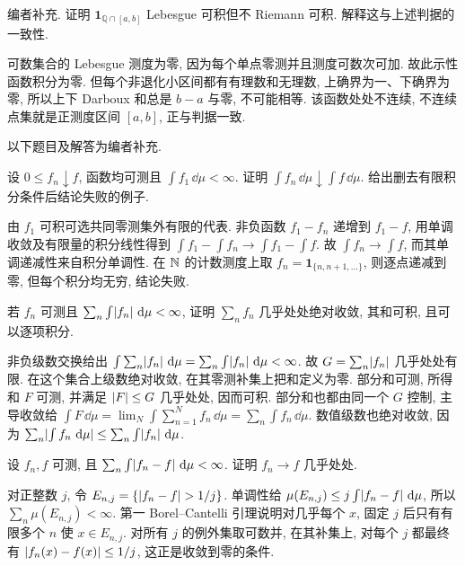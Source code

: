 \begin{example}
编者补充. 证明 $\mathbf1_{\mathbb Q\cap[a,b]}$ Lebesgue 可积但不 Riemann 可积. 解释这与上述判据的一致性.
\end{example}
\begin{solution}
可数集合的 Lebesgue 测度为零, 因为每个单点零测并且测度可数次可加. 故此示性函数积分为零. 但每个非退化小区间都有有理数和无理数, 上确界为一、下确界为零, 所以上下 Darboux 和总是 $b-a$ 与零, 不可能相等. 该函数处处不连续, 不连续点集就是正测度区间 $[a,b]$, 正与判据一致.
\end{solution}

以下题目及解答为编者补充.

\begin{exercise}
设 $0\le f_n\downarrow f$, 函数均可测且 $\int f_1\,\dd\mu<\infty$. 证明 $\int f_n\,\dd\mu\downarrow\int f\,\dd\mu$. 给出删去有限积分条件后结论失败的例子.
\end{exercise}
\begin{solution}
由 $f_1$ 可积可选共同零测集外有限的代表. 非负函数 $f_1-f_n$ 递增到 $f_1-f$, 用单调收敛及有限量的积分线性得到 $\int f_1-\int f_n\to\int f_1-\int f$. 故 $\int f_n\to\int f$, 而其单调递减性来自积分单调性. 在 $\mathbb N$ 的计数测度上取 $f_n=\mathbf1_{\{n,n+1,\ldots\}}$, 则逐点递减到零, 但每个积分均无穷, 结论失败.
\end{solution}

\begin{exercise}
若 $f_n$ 可测且 $\sum_n\int\lvert f_n\rvert\,\,\mathrm d\mu<\infty$, 证明 $\sum_nf_n$ 几乎处处绝对收敛, 其和可积, 且可以逐项积分.
\end{exercise}
\begin{solution}
非负级数交换给出 $\int\sum_n\lvert f_n\rvert\,\,\mathrm d\mu=\sum_n\int\lvert f_n\rvert\,\,\mathrm d\mu<\infty$. 故 $G=\sum_n\lvert f_n\rvert$ 几乎处处有限. 在这个集合上级数绝对收敛, 在其零测补集上把和定义为零. 部分和可测, 所得和 $F$ 可测, 并满足 $\lvert F\rvert\le G$ 几乎处处, 因而可积. 部分和也都由同一个 $G$ 控制, 主导收敛给 $\int F\,\dd\mu=\lim_N\int\sum_{n=1}^{N}f_n\,\dd\mu=\sum_n\int f_n\,\dd\mu$. 数值级数也绝对收敛, 因为 $\sum_n\lvert \int f_n\,\,\mathrm d\mu\rvert\le\sum_n\int\lvert f_n\rvert\,\,\mathrm d\mu$.
\end{solution}

\begin{exercise}
设 $f_n,f$ 可测, 且 $\sum_n\int\lvert f_n-f\rvert\,\,\mathrm d\mu<\infty$. 证明 $f_n\to f$ 几乎处处.
\end{exercise}
\begin{solution}
对正整数 $j$, 令 $E_{n,j}=\{\lvert f_n-f\rvert>1/j\}$. 单调性给 $\mu(E_{n,j})\le j\int\lvert f_n-f\rvert\,\,\mathrm d\mu$, 所以 $\sum_n\mu(E_{n,j})<\infty$. 第一 Borel--Cantelli 引理说明对几乎每个 $x$, 固定 $j$ 后只有有限多个 $n$ 使 $x\in E_{n,j}$. 对所有 $j$ 的例外集取可数并, 在其补集上, 对每个 $j$ 都最终有 $\lvert f_n(x)-f(x)\rvert\le1/j$, 这正是收敛到零的条件.
\end{solution}

